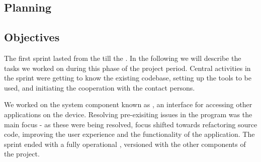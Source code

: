 
\subsection{Planning}

\subsection{Objectives}
The first sprint lasted from the  till the .
In the following we will describe the tasks we worked on during this phase of the project period. 
Central activities in the sprint were getting to know the existing codebase, setting up the tools to be used, and initiating the cooperation with the contact persons.

We worked on the system component known as \textit{\launcher}, an interface for accessing other \giraf applications on the device.
Resolving pre-exisiting issues in the program was the main focus - as these were being resolved, focus shifted towards refactoring source code, improving the user experience and the functionality of the application.
The sprint ended with a fully operational \launcher, versioned with the other components of the project.